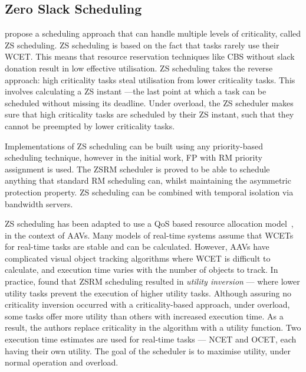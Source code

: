 \subsection{Zero Slack Scheduling}
\label{s:zero-slack-scheduling}

 propose a scheduling approach that can handle multiple levels of criticality,
called \gls{ZS} scheduling. \gls{ZS} scheduling is based on the fact that tasks rarely use their
\gls{WCET}.  This means that resource reservation techniques like \gls{CBS} without slack donation
result in low effective utilisation.  ZS scheduling takes the reverse approach: high criticality
tasks steal utilisation from lower criticality tasks.  This involves calculating a \gls{ZS} instant
---the last point at which a task can be scheduled without missing its deadline.  Under overload, the
\gls{ZS} scheduler makes sure that high criticality tasks are scheduled by their \gls{ZS} instant,
such that they cannot be preempted by lower criticality tasks.

Implementations of \gls{ZS} scheduling can be built using any priority-based scheduling technique,
however in the initial work, \gls{FP} with \gls{RM} priority assignment is used.  The
\gls{ZS}\gls{RM} scheduler is proved to be able to schedule anything that standard \gls{RM}
scheduling can, whilst maintaining the asymmetric protection property.  \gls{ZS} scheduling can be
combined with temporal isolation via bandwidth servers.

\gls{ZS} scheduling has been adapted to use a \gls{QoS} based resource allocation
model~\citep{deNiz_WSRR_12}, in the context of \glspl{AAV}. Many models of real-time systems assume
that \glspl{WCET} for real-time tasks are stable and can be calculated.  However, \glspl{AAV} have
complicated visual object tracking algorithms where \gls{WCET} is difficult to calculate, and
execution time varies with the number of objects to track.  In practice,  found
that \gls{ZS}\gls{RM} scheduling resulted in \emph{utility inversion} --- where lower utility tasks
prevent the execution of higher utility tasks.  Although assuring no criticality inversion occurred
with a criticality-based approach, under overload, some tasks offer more utility than others with
increased execution time.  As a result, the authors replace criticality in the algorithm with a
utility function.  Two execution time estimates are used for real-time tasks --- \gls{NCET} and
\gls{OCET}, each having their own utility.  The goal of the scheduler is to maximise utility, under
normal operation and overload.

